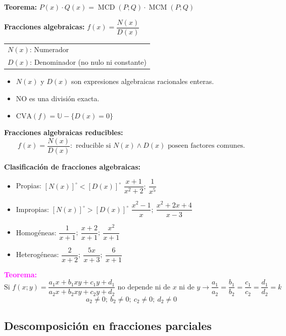 \documentclass[11pt,a4paper]{article}
\newcommand{\hl}[1]{\textcolor{resaltado}{#1}}
\begin{document}
\textcolor{rojo}{\textbf{Teorema:}} \quad $P(x)\cdot Q(x) = \operatorname{MCD}(P;Q)\cdot\operatorname{MCM}(P;Q)$

\textbf{Fracciones \hl{algebraicas}:} \quad
$f(x) = \dfrac{N(x)}{D(x)}$ \quad
\begin{tabular}{l}
$N(x)$: Numerador\\
$D(x)$: Denominador (no nulo ni constante)
\end{tabular}

\begin{itemize}[label=\checkmark]
  \item $N(x)$ y $D(x)$ son expresiones algebraicas racionales enteras.
  \item NO es una división exacta.
  \item $\text{CVA}(f) = \mathbb{U} - \{D(x) = 0\}$
\end{itemize}


\textbf{Fracciones algebraicas reducibles:}
\[f(x) = \frac{N(x)}{D(x)}: \text{ reducible si } N(x) \wedge D(x) \text{ poseen factores comunes.}\]

\textcolor{naranja}{\textbf{Clasificación de fracciones algebraicas:}}
\begin{itemize}[label={}]
  \item \textcolor{verde}{Propias:} $[N(x)]^\circ < [D(x)]^\circ$ \hfill
  $\dfrac{x+1}{x^2+2};\ \dfrac{1}{x^5}$ \hspace*{3cm}
  \item \textcolor{verde}{Impropias:} $[N(x)]^\circ > [D(x)]^\circ$ \hfill
  $\dfrac{x^2-1}{x};\ \dfrac{x^2+2x+4}{x-3}$ \hspace*{3cm}
  \item \textcolor{verde}{Homogéneas:} $\dfrac{1}{x+1};\ \dfrac{x+2}{x+1};\ \dfrac{x^2}{x+1}$
  \item \textcolor{verde}{Heterogéneas:} $\dfrac{2}{x+2};\ \dfrac{5x}{x+3};\ \dfrac{6}{x+1}$
\end{itemize}

\textcolor{magenta}{\textbf{Teorema:}}
\[
\text{Si } f(x;y) = \frac{a_1x + b_1xy + c_1y + d_1}{a_2x + b_2xy + c_2y + d_2}
\text{ no depende ni de $x$ ni de $y$} \rightarrow
\frac{a_1}{a_2} = \frac{b_1}{b_2} = \frac{c_1}{c_2} = \frac{d_1}{d_2} = k
\]
\[a_2 \neq 0;\ b_2 \neq 0;\ c_2 \neq 0;\ d_2 \neq 0\]

\subsection*{Descomposición en fracciones parciales}
\end{document}
